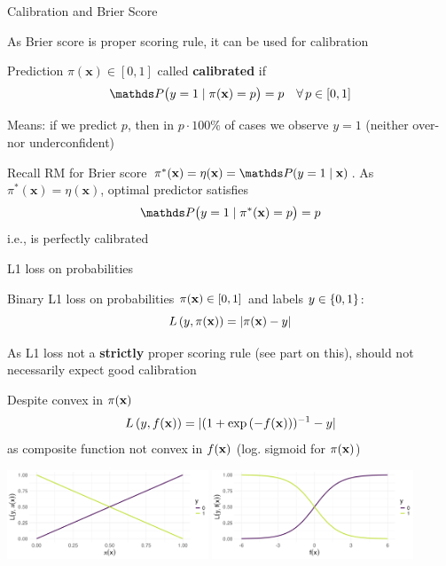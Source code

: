 \documentclass[11pt,compress,t,notes=noshow, xcolor=table]{beamer}
\begin{document}
\begin{vbframe}{Calibration and Brier Score}

\begin{itemizeL}
    \item As Brier score is proper scoring rule, it can be used for calibration
    \item Prediction $\pi(\mathbf{x})\in[0,1]$ called \textbf{calibrated} if 
$$\P\bigl(y=1 \mid \pi(\mathbf{x})=p\bigr)=p \quad \forall\, p\in[0,1]$$
    \item Means: if we predict $p$, then in $p \cdot 100\%$ of cases we observe $y=1$ (neither over- nor underconfident)
    \item Recall RM for Brier score $\pi^*(\mathbf{x}) = \eta(\mathbf{x}) = \P(y=1 \mid \mathbf{x})$. As \(\pi^*(\mathbf{x})=\eta(\mathbf{x})\), optimal predictor satisfies $$\P\bigl(y=1 \mid \pi^*(\mathbf{x})=p\bigr)=p$$
i.e., is perfectly calibrated
\end{itemizeL}

\end{vbframe}

\begin{vbframe}{L1 loss on probabilities}
\begin{itemizeM}
    \item Binary L1 loss on probabilities $\pi(\mathbf{x}) \in [0, 1]$ and labels $y \in \{0, 1\}$: $$L\left(y, \pi(\mathbf{x})\right) = |\pi(\mathbf{x}) - y|$$
    \item As L1 loss not a \textbf{strictly} proper scoring rule (see part on this), should not necessarily expect good calibration
    \item Despite convex in $\pi(\mathbf{x})$ $$L\left(y, f(\mathbf{x})\right)=|(1+\exp{(-f(\mathbf{x}))})^{-1}-y|$$ as composite function not convex in $f(\mathbf{x})$ (log. sigmoid for $\pi(\mathbf{x})$)
\end{itemizeM}

\begin{center}
\includegraphics[width = 0.45\textwidth]{figure/l1_loss.png}
\includegraphics[width = 0.45\textwidth]{figure/l1_loss_on_score.png}
\end{center}


\end{vbframe}





\endlecture
\end{document}
